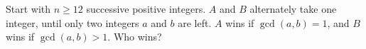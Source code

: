 Start with $n \geq 12$ successive positive integers. $A$ and $B$ alternately take one integer, until only two integers $a$ and $b$ are left. $A$ wins if $\gcd(a, b) = 1$, and $B$ wins if $\gcd(a, b) > 1$. Who wins?
